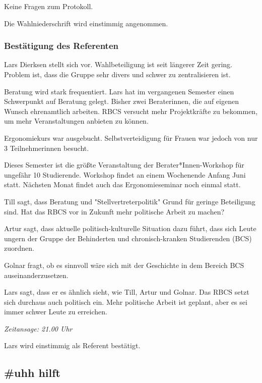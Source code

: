 \documentclass[ngerman,headheight=70pt]{scrartcl}
\begin{document}
    Keine Fragen zum Protokoll.

    Die Wahlniederschrift wird einstimmig angenommen.

    \subsubsection{Bestätigung des Referenten}

    Lars Dierksen stellt sich vor. Wahlbeteiligung ist seit längerer Zeit gering.
    Problem ist, dass die Gruppe sehr divers und schwer zu zentralisieren
    ist.

    Beratung wird stark frequentiert. Lars hat im vergangenen Semester
    einen Schwerpunkt auf Beratung gelegt. Bisher zwei Beraterinnen,
    die auf eigenen Wunsch ehrenamtlich arbeiten. RBCS versucht mehr
    Projektkräfte zu bekommen, um mehr Veranstaltungen anbieten zu können.

    Ergonomiekurs war ausgebucht. Selbstverteidigung für Frauen war jedoch
    von nur 3 Teilnehmerinnen besucht.

    Dieses Semester ist die größte Veranstaltung der Berater*Innen-Workshop
    für ungefähr 10 Studierende. Workshop findet an einem Wochenende
    Anfang Juni statt. Nächsten Monat findet auch das Ergonomieseminar noch einmal
    statt.

    Till sagt, dass Beratung und "Stellvertreterpolitik" Grund für geringe
    Beteiligung sind. Hat das RBCS vor in Zukunft mehr politische Arbeit
    zu machen?

    Artur sagt, dass aktuelle politisch-kulturelle Situation dazu führt, dass
    sich Leute ungern der Gruppe der Behinderten und chronisch-kranken
    Studierenden (BCS) zuordnen.

    Golnar fragt, ob es sinnvoll wäre sich mit der Geschichte in dem Bereich
    BCS auseinanderzusetzen.

    Lars sagt, dass er es ähnlich sieht, wie Till, Artur und Golnar. Das RBCS
    setzt sich durchaus auch politisch ein. Mehr politische Arbeit ist
    geplant, aber es sei immer schwer Leute zu erreichen.

    \textit{Zeitansage: 21.00 Uhr}

    Lars wird einstimmig als Referent bestätigt.

    \subsection{\#uhh hilft}
\end{document}
